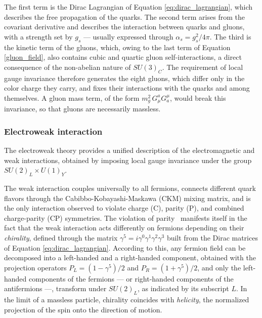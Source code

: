 %
The first term is the Dirac Lagrangian of Equation \ref{eq:dirac_lagrangian}, which describes the free propagation of the quarks. The second term arises from the covariant derivative and describes the interaction between quarks and gluons, with a strength set by $g_s$ — usually expressed through $\alpha_s = g_s^2/4\pi$. The third is the kinetic term of the gluons, which, owing to the last term of Equation \ref{gluon_field}, also contains cubic and quartic gluon self-interactions, a direct consequence of the non-abelian nature of $SU(3)_C$. The requirement of local gauge invariance therefore generates the eight gluons, which differ only in the color charge they carry, and fixes their interactions with the quarks and among themselves. A gluon mass term, of the form $m_g^2\, G^a_\mu G_a^\mu$, would break this invariance, so that gluons are necessarily massless.


\subsubsection{Electroweak interaction}
%
The electroweak theory provides a unified description of the electromagnetic and weak interactions, obtained by imposing local gauge invariance under the group $SU(2)_L \times U(1)_Y$.

The weak interaction couples universally to all fermions, connects different quark flavors through the Cabibbo-Kobayashi-Maskawa (CKM) mixing matrix, and is the only interaction observed to violate charge (C), parity (P), and combined charge-parity (CP) symmetries. The violation of parity~\cite{Lee:1956qn,Wu:1957my} manifests itself in the fact that the weak interaction acts differently on fermions depending on their \textit{chirality}, defined through the matrix $\gamma^5 = i\gamma^0\gamma^1\gamma^2\gamma^3$ built from the Dirac matrices of Equation \ref{eq:dirac_lagrangian}. According to this, any fermion field can be decomposed into a left-handed and a right-handed component, obtained with the projection operators $P_L = (1-\gamma^5)/2$ and $P_R = (1+\gamma^5)/2$, and only the left-handed components of the fermions — or right-handed components of the antifermions —, transform under $SU(2)_L$, as indicated by its subscript $L$. In the limit of a massless particle, chirality coincides with \textit{helicity}, the normalized projection of the spin onto the direction of motion.

